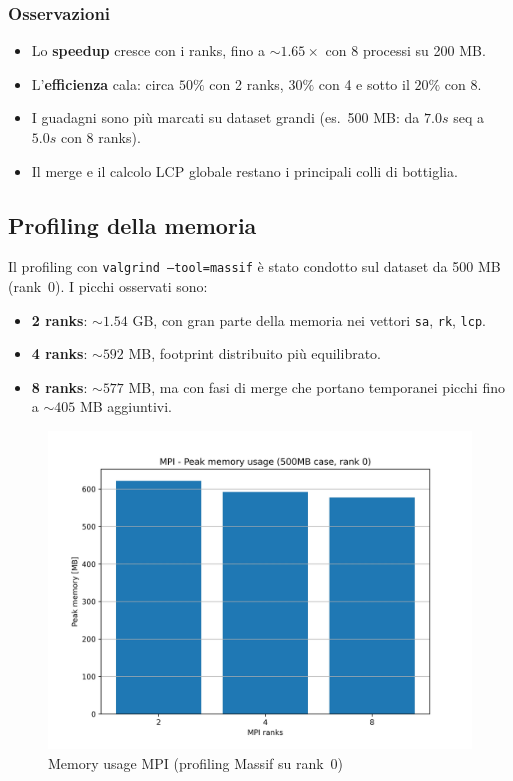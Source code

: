 			\subsubsection*{Osservazioni}
				\begin{itemize}
						\item Lo \textbf{speedup} cresce con i ranks, fino a \(\sim 1.65\times\) con 8 processi su 200 MB.
						\item L’\textbf{efficienza} cala: circa \(50\%\) con 2 ranks, \(30\%\) con 4 e sotto il \(20\%\) con 8.
						\item I guadagni sono più marcati su dataset grandi (es.\ 500 MB: da $7.0s$ seq a $5.0s$ con 8 ranks).
						\item Il merge e il calcolo LCP globale restano i principali colli di bottiglia.
				\end{itemize}
		
		\subsection{Profiling della memoria}
			Il profiling con \texttt{valgrind --tool=massif} è stato condotto sul dataset da 500 MB (rank~0).
			I picchi osservati sono:
			
			\begin{itemize}
				\item \textbf{2 ranks}: \(\sim 1.54\) GB, con gran parte della memoria nei vettori \texttt{sa}, \texttt{rk}, \texttt{lcp}.
				\item \textbf{4 ranks}: \(\sim 592\) MB, footprint distribuito più equilibrato.
				\item \textbf{8 ranks}: \(\sim 577\) MB, ma con fasi di merge che portano temporanei picchi fino a \(\sim 405\) MB aggiuntivi.
			\end{itemize}
			
			\begin{figure}[H]
				\centering
				\includegraphics[width=1\linewidth]{img/mpi_plots/mpi_memory.jpg}
				\caption{Memory usage MPI (profiling Massif su rank~0)}
				\label{fig:mpi_mem_usage}
			\end{figure}
			
